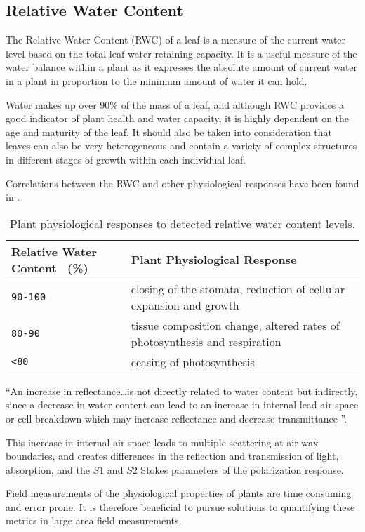 \subsection{Relative Water Content}
The Relative Water Content (RWC) of a leaf is a measure of the current water level based on the total leaf water retaining capacity.  It is a useful measure of the water balance within a plant as it expresses the absolute amount of current water in a plant in proportion to the minimum amount of water it can hold.

Water makes up over 90\% of the mass of a leaf, and although RWC provides a good indicator of plant health and water capacity, it is highly dependent on the age and maturity of the leaf.  It should also be taken into consideration that leaves can also be very heterogeneous and contain a variety of complex structures in different stages of growth within each individual leaf.

Correlations between the RWC and other physiological responses have been found in \cite{ecophysiology}.

\begin{table}[h]
  \centering
  \begin{tabular}{ll}
    \toprule
    \textbf{Relative Water Content ~(\%)}      & \textbf{Plant Physiological Response}\\
    \midrule
      \texttt{90-100}          & closing of the stomata, reduction of cellular expansion and growth\\
      \texttt{80-90}           & tissue composition change, altered rates of photosynthesis and respiration\\
      \texttt{<80}         & ceasing of photosynthesis\\
    \bottomrule
  \end{tabular}
  \caption{%
    Plant physiological responses to detected relative water content levels.
  }
  \label{tab:Packages}
\end{table}

“An increase in reflectance…is not directly related to water content but indirectly, since a decrease in water content can lead to an increase in internal lead air space or cell breakdown which may increase reflectance and decrease transmittance \cite{photonvegetation}”.

This increase in internal air space leads to multiple scattering at air wax boundaries, and creates differences in the reflection and transmission of light, absorption, and the $S1$ and $S2$ Stokes parameters of the polarization response.

Field measurements of the physiological properties of plants are time consuming and error prone.  It is therefore beneficial to pursue solutions to quantifying these metrics in large area field measurements.
